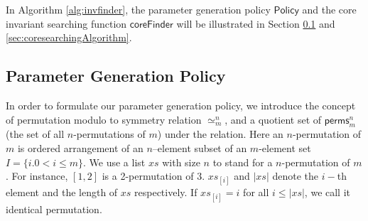 \documentclass[final]{IEEEtran}
\newcommand\caicomment[1]{\textcolor{red}{comment: #1} }
\begin{document}


In Algorithm \ref{alg:invfinder}, the parameter generation policy $\mathsf{Policy}$  and the core invariant searching function $\mathsf{coreFinder}$ will be illustrated in Section \ref{sec:parameterGenPolicy} and \ref{sec:coresearchingAlgorithm}.


\vspace{-0.5cm}
\subsection{Parameter Generation Policy}\label{sec:parameterGenPolicy}
In order to formulate our parameter generation policy, we introduce the concept of permutation modulo to symmetry relation $\simeq_m^n$,  and a quotient set of $\mathsf{perms}_{m}^{n}$ (the set of all $n$-permutations of $m$) under the  relation.  Here an $n$-permutation of $m$ is ordered arrangement of  an $n$--element subset of an $m$-element set $I=\{i. 0<i\le m\}$. We use a list $xs$ with size $n$ to stand for a $n$-permutation of $m$. For instance, $[1,2]$ is a 2-permutation of 3. $xs_{[i]}$ and $|xs|$  denote  the $i-$th element and the length of $xs$ respectively. If $xs_{[i]}=i$ for all $i \le |xs|$, we call it identical permutation. %
\end{document}

